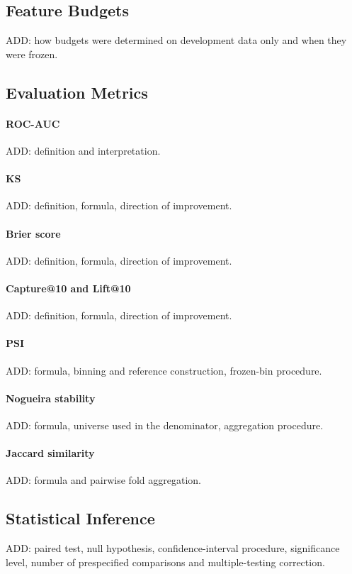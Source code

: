 \documentclass[final,5p,twocolumn]{elsarticle}
\begin{document}
\subsection{Feature Budgets}
\label{subsec:feature_budgets}
ADD: how budgets were determined on development data only and when they were frozen.

\subsection{Evaluation Metrics}
\label{subsec:metrics}

\paragraph{ROC-AUC}
ADD: definition and interpretation.

\paragraph{KS}
ADD: definition, formula, direction of improvement.

\paragraph{Brier score}
ADD: definition, formula, direction of improvement.

\paragraph{Capture@10 and Lift@10}
ADD: definition, formula, direction of improvement.

\paragraph{PSI}
ADD: formula, binning and reference construction, frozen-bin procedure.

\paragraph{Nogueira stability}
ADD: formula, universe used in the denominator, aggregation procedure.

\paragraph{Jaccard similarity}
ADD: formula and pairwise fold aggregation.

\subsection{Statistical Inference}
\label{subsec:inference}
ADD: paired test, null hypothesis, confidence-interval procedure, significance level, number of prespecified comparisons and multiple-testing correction.
\end{document}
